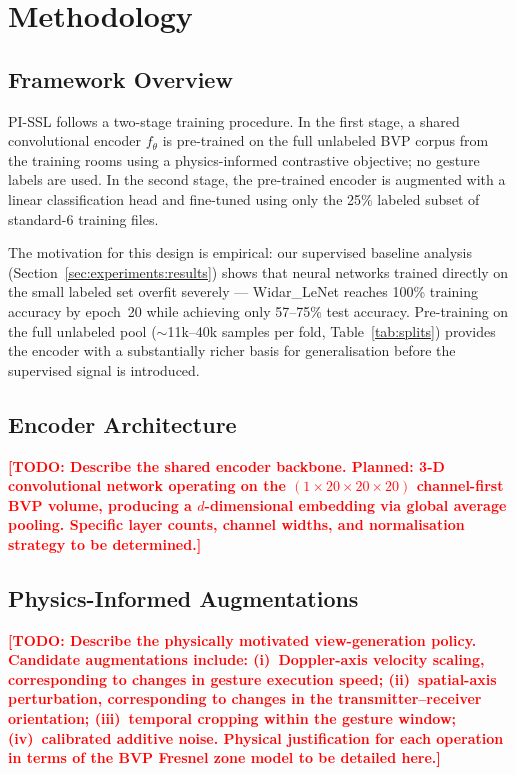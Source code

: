 \documentclass[journal]{IEEEtran}
\newcommand{\todo}[1]{\textcolor{red}{\textbf{[TODO: #1]}}}
\begin{document}
\section{Methodology}
\label{sec:method}

\subsection{Framework Overview}
\label{sec:method:overview}

PI-SSL follows a two-stage training procedure.
In the first stage, a shared convolutional encoder $f_\theta$ is
pre-trained on the full unlabeled BVP corpus from the training rooms
using a physics-informed contrastive objective; no gesture labels are
used.
In the second stage, the pre-trained encoder is augmented with a
linear classification head and fine-tuned using only the 25\%
labeled subset of standard-6 training files.

The motivation for this design is empirical: our supervised baseline
analysis (Section~\ref{sec:experiments:results}) shows that neural
networks trained directly on the small labeled set overfit severely ---
Widar\_LeNet reaches 100\% training accuracy by epoch~20 while
achieving only 57--75\% test accuracy.
Pre-training on the full unlabeled pool ($\sim$11k--40k samples per
fold, Table~\ref{tab:splits}) provides the encoder with a
substantially richer basis for generalisation before the supervised
signal is introduced.

\subsection{Encoder Architecture}
\label{sec:method:encoder}

\todo{Describe the shared encoder backbone. Planned: 3-D convolutional
network operating on the $(1 \times 20 \times 20 \times 20)$
channel-first BVP volume, producing a $d$-dimensional embedding via
global average pooling. Specific layer counts, channel widths, and
normalisation strategy to be determined.}

\subsection{Physics-Informed Augmentations}
\label{sec:method:augmentations}

\todo{Describe the physically motivated view-generation policy.
Candidate augmentations include: (i)~Doppler-axis velocity scaling,
corresponding to changes in gesture execution speed;
(ii)~spatial-axis perturbation, corresponding to changes in the
transmitter--receiver orientation; (iii)~temporal cropping within the
gesture window; (iv)~calibrated additive noise. Physical justification
for each operation in terms of the BVP Fresnel zone model to be
detailed here.}
\end{document}
